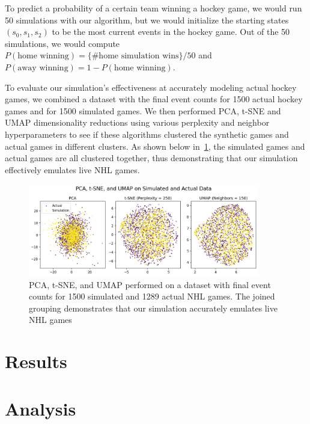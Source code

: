 \documentclass[11pt]{article}
\begin{document}
To predict a probability of a certain team winning a hockey game, we would run 
50 simulations with our algorithm, but we would initialize the starting states 
$(s_0, s_1, s_2)$ to be the most current events in the hockey game. Out of the 
50 simulations, we would compute 
$P(\text{home winning}) = \{\text{\# home simulation wins}\}/50$ and 
$P(\text{away winning}) = 1-P(\text{home winning})$.

To evaluate our simulation's effectiveness at accurately modeling actual hockey 
games, we combined a dataset with the final event counts for 1500 actual hockey 
games and for 1500 simulated games. We then performed PCA, t-SNE and UMAP 
dimensionality reductions using various perplexity and neighbor hyperparameters 
to see if these algorithms clustered the synthetic games and actual games in 
different clusters. As shown below in~\ref{fig:simulation_v_actual}, the simulated
games and actual games are all clustered together, thus demonstrating that our
simulation effectively emulates live NHL games.

\begin{figure}[H]
    \centering
    \includegraphics[width=0.9\textwidth]{images/pca_tsne_umap_sim_act.png}
    \caption{PCA, t-SNE, and UMAP performed on a dataset with final event counts for 1500 simulated and 1289 actual NHL games. The joined grouping demonstrates that our simulation accurately emulates live NHL games}
    \label{fig:simulation_v_actual}
\end{figure}




\section{Results}

\section{Analysis}
\end{document}
